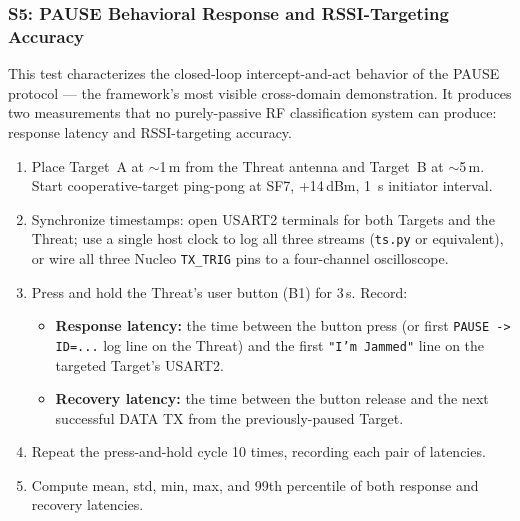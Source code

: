 \documentclass[11pt,letterpaper]{article}
\begin{document}
	\subsubsection{S5: PAUSE Behavioral Response and RSSI-Targeting Accuracy}

	This test characterizes the closed-loop intercept-and-act behavior of the PAUSE protocol --- the framework's most visible cross-domain demonstration. It produces two measurements that no purely-passive RF classification system can produce: response latency and RSSI-targeting accuracy.

	\begin{tcolorbox}[infobox={Test Protocol: S5 Response and Recovery Latency}]
		\begin{enumerate}
			\item Place Target~A at $\sim$1\,m from the Threat antenna and Target~B at $\sim$5\,m. Start cooperative-target ping-pong at SF7, +14\,dBm, 1~s initiator interval.
			\item Synchronize timestamps: open USART2 terminals for both Targets and the Threat; use a single host clock to log all three streams (\texttt{ts.py} or equivalent), or wire all three Nucleo \texttt{TX\_TRIG} pins to a four-channel oscilloscope.
			\item Press and hold the Threat's user button (B1) for 3\,s. Record:
			\begin{itemize}
				\item \textbf{Response latency:} the time between the button press (or first \texttt{PAUSE -> ID=...} log line on the Threat) and the first \texttt{"I'm Jammed"} line on the targeted Target's USART2.
				\item \textbf{Recovery latency:} the time between the button release and the next successful DATA TX from the previously-paused Target.
			\end{itemize}
			\item Repeat the press-and-hold cycle 10 times, recording each pair of latencies.
			\item Compute mean, std, min, max, and 99th percentile of both response and recovery latencies.
		\end{enumerate}
	\end{tcolorbox}
\end{document}
